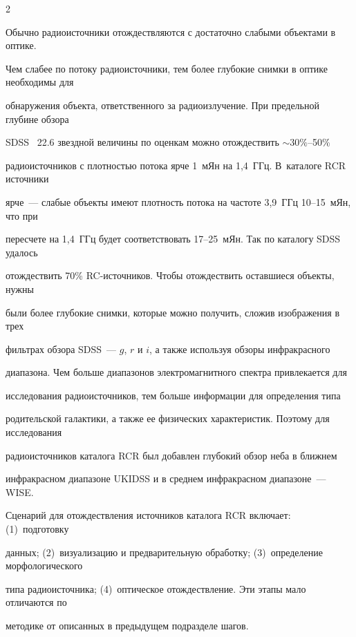 \begin{multicols}{2}
      

      Обычно радиоисточники отождествляются с доста\-точ\-но слабыми объектами в оптике. 

Чем слабее по потоку радиоисточники, тем более глубокие снимки в оптике необходимы для 

обнаружения объекта, ответственного за радиоизлучение. При предельной глубине обзора 

SDSS ~22.6 звездной величины по оценкам можно отождествить $\sim30\%$--50\% 

радиоисточников с плотностью потока ярче 1~мЯн на 1,4~ГГц. В~каталоге RCR источники 

ярче~--- слабые объекты имеют плотность потока на частоте 3,9~ГГц 10--15~мЯн, что при 

пересчете на 1,4~ГГц будет соответствовать 17--25~мЯн. Так по каталогу SDSS удалось 

отождествить 70\% RC-ис\-точ\-ни\-ков. Чтобы отождествить оставшиеся объекты, нужны 

были более глубокие снимки, которые можно получить, сложив изображения в трех 

фильтрах обзора SDSS~--- $g$, $r$ и $i$, а также используя обзоры инфракрасного 

диапазона. Чем больше диапазонов электромагнитного спектра привлекается для 

исследования радиоисточников, тем больше информации для определения типа 

родительской галактики, а также ее физических характеристик. Поэтому для исследования 

радиоисточников каталога RCR был добавлен глубокий обзор неба в ближнем 

инфракрасном диапазоне UKIDSS и в среднем инфракрасном диапазоне~--- WISE. 

      

      Сценарий для отождествления источников каталога RCR включает: (1)~подготовку 

данных; (2)~визуализацию и предварительную обработку; (3)~определение морфологического 

типа радиоисточника; (4)~оптическое отождествление. Эти этапы мало отличаются по 

методике от описанных в предыдущем подразделе шагов. 



      \begin{table}[b]\small

      \begin{center}


\end{center}
\end{table}
\end{multicols}
